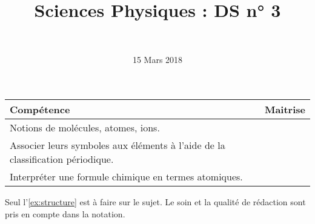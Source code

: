 \documentclass[a4paper,11pt]{exam}
\author{\ }
\date{15 Mars 2018}
\title{Sciences Physiques : DS n° 3}
\begin{document}
%	

	\maketitle
	
\begin{small}
	\begin{center}
		\begin{tabular}{|@{\ }l@{}|@{\ }c@{\ }|}
			\hline
			\textbf{Compétence} & \textbf{Maitrise} \\
			\hline
		Notions de molécules, atomes, ions. \ \ &  \ \ \ \\
			\hline
			Associer leurs symboles aux éléments à l’aide de la classification périodique. \ &  \\
			\hline
			Interpréter une formule chimique en termes atomiques. &  \\
			\hline
		\end{tabular}
	\end{center}
\end{small}	
	
	

Seul l'\ref{ex:structure} est à faire sur le sujet. Le soin et la qualité de rédaction sont pris en compte dans la notation.


%
%
%

%






%
















\newpage




 
%
\ \label{LastPage}
\end{document}
